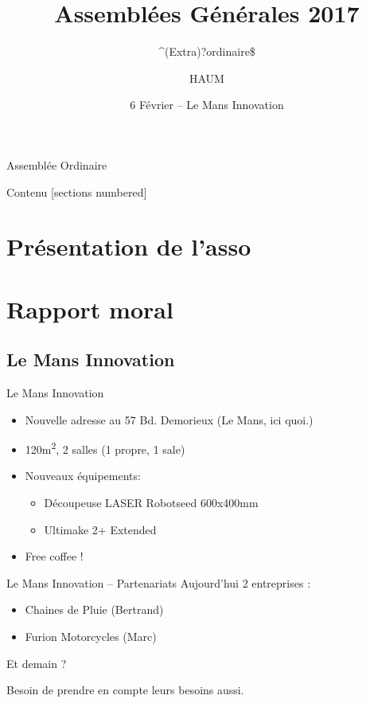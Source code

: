 \documentclass[10pt]{beamer}
\title{Assemblées Générales 2017}
\subtitle{\^{}(Extra)?ordinaire\$}
\author{HAUM}
\date{6 Février -- Le Mans Innovation}
\institute{}
\begin{document}
\maketitle

\begin{frame}[standout]
	Assemblée Ordinaire
\end{frame}

\begin{frame}{Contenu}
	[sections numbered]
	\tableofcontents[hideallsubsections]
\end{frame}

\section{Présentation de l'asso}
\section{Rapport moral}

\subsection{Le Mans Innovation}
\begin{frame}{Le Mans Innovation}
	\begin{itemize}
		\item Nouvelle adresse au 57 Bd. Demorieux (Le Mans, ici quoi.)
		\item 120m\textsuperscript{2}, 2 salles (1 propre, 1 sale)
		\item Nouveaux équipements:
			\begin{itemize}
				\item Découpeuse LASER Robotseed 600x400mm
				\item Ultimake 2+ Extended
			\end{itemize}
		\item Free coffee !
	\end{itemize}
\end{frame}

\begin{frame}{Le Mans Innovation -- Partenariats}
	Aujourd'hui 2 entreprises :

	\begin{itemize}
		\item Chaines de Pluie (Bertrand)
		\item Furion Motorcycles (Marc)
	\end{itemize}

	Et demain ?

	Besoin de prendre en compte leurs besoins aussi.
\end{frame}
\end{document}
